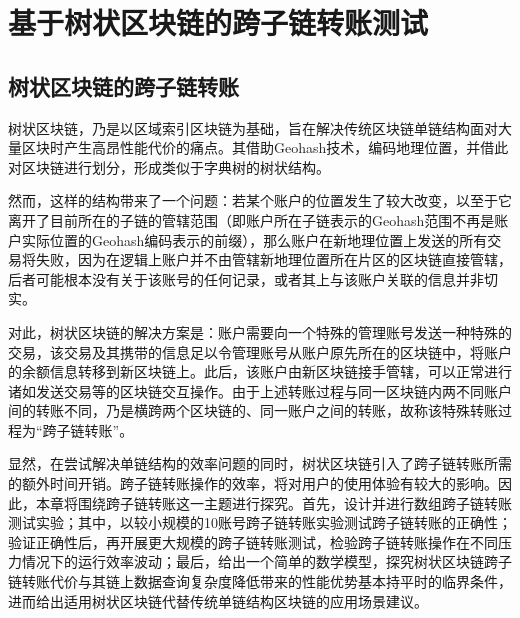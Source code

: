 %
%
%
%
%

\chapter{基于树状区块链的跨子链转账测试}

\section{树状区块链的跨子链转账}

树状区块链，乃是以区域索引区块链为基础，旨在解决传统区块链单链结构面对大量区块时产生高昂性能代价的痛点。其借助Geohash技术，编码地理位置，并借此对区块链进行划分，形成类似于字典树的树状结构。

然而，这样的结构带来了一个问题：若某个账户的位置发生了较大改变，以至于它离开了目前所在的子链的管辖范围（即账户所在子链表示的Geohash范围不再是账户实际位置的Geohash编码表示的前缀），那么账户在新地理位置上发送的所有交易将失败，因为在逻辑上账户并不由管辖新地理位置所在片区的区块链直接管辖，后者可能根本没有关于该账号的任何记录，或者其上与该账户关联的信息并非切实。

对此，树状区块链的解决方案是：账户需要向一个特殊的管理账号发送一种特殊的交易，该交易及其携带的信息足以令管理账号从账户原先所在的区块链中，将账户的余额信息转移到新区块链上。此后，该账户由新区块链接手管辖，可以正常进行诸如发送交易等的区块链交互操作。由于上述转账过程与同一区块链内两不同账户间的转账不同，乃是横跨两个区块链的、同一账户之间的转账，故称该特殊转账过程为“跨子链转账”。

显然，在尝试解决单链结构的效率问题的同时，树状区块链引入了跨子链转账所需的额外时间开销。跨子链转账操作的效率，将对用户的使用体验有较大的影响。因此，本章将围绕跨子链转账这一主题进行探究。首先，设计并进行数组跨子链转账测试实验；其中，以较小规模的10账号跨子链转账实验测试跨子链转账的正确性；验证正确性后，再开展更大规模的跨子链转账测试，检验跨子链转账操作在不同压力情况下的运行效率波动；最后，给出一个简单的数学模型，探究树状区块链跨子链转账代价与其链上数据查询复杂度降低带来的性能优势基本持平时的临界条件，进而给出适用树状区块链代替传统单链结构区块链的应用场景建议。

